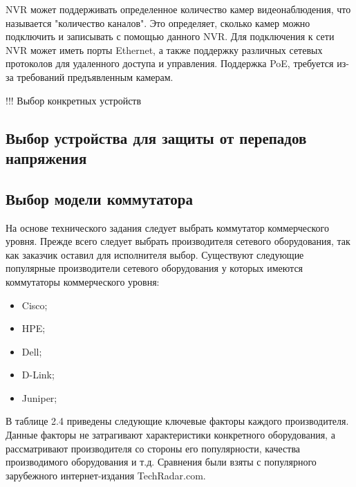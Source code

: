 NVR может поддерживать определенное количество камер видеонаблюдения, 
что называется "количество каналов". Это определяет, сколько камер можно подключить и 
записывать с помощью данного NVR. Для подключения к сети NVR может иметь порты Ethernet, а также 
поддержку различных сетевых протоколов для удаленного доступа и управления. Поддержка PoE, требуется 
из-за требований предъявленным камерам. 

!!! Выбор конкретных устройств

\subsection{Выбор устройства для защиты от перепадов напряжения}


\subsection{Выбор модели коммутатора}

На основе технического задания следует выбрать коммутатор коммерческого уровня. Прежде всего следует выбрать производителя
сетевого оборудования, так как заказчик оставил для исполнителя выбор.
Существуют следующие популярные производители сетевого оборудования у которых имеются коммутаторы коммерческого уровня:

\begin{itemize}
    \item Cisco;
    \item HPE;
    \item Dell;
    \item D-Link;
    \item Juniper;
\end{itemize}

В таблице 2.4 приведены следующие ключевые факторы каждого производителя. Данные факторы не затрагивают характеристики конкретного оборудования,
а рассматривают производителя со стороны его популярности, качества производимого оборудования и т.д. Сравнения были взяты с популярного зарубежного
интернет-издания TechRadar.com.

